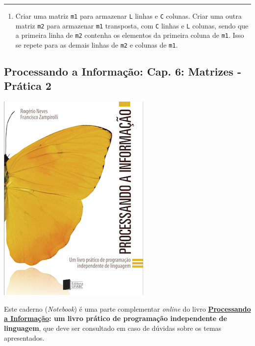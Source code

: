 \documentclass[12pt,a4paper]{article}
\renewcommand{\linethickness}{0.05em}
\providecommand{\tightlist}{%
      \setlength{\itemsep}{0pt}\setlength{\parskip}{0pt}}
\begin{document}
    \begin{center}\rule{0.5\linewidth}{\linethickness}\end{center}

\begin{enumerate}
\def\labelenumi{\arabic{enumi}.}
\setcounter{enumi}{4}
\tightlist
\item
  Criar uma matriz \texttt{m1} para armazenar \texttt{L} linhas e
  \texttt{C} colunas. Criar uma outra matriz \texttt{m2} para armazenar
  \texttt{m1} transposta, com \texttt{C} linhas e \texttt{L} colunas,
  sendo que a primeira linha de \texttt{m2} contenha os elementos da
  primeira coluna de \texttt{m1}. Isso se repete para as demais linhas
  de \texttt{m2} e colunas de \texttt{m1}.
\end{enumerate}

    \hypertarget{processando-a-informauxe7uxe3o-cap.-6-matrizes---pruxe1tica-2}{%
\subsection{Processando a Informação: Cap. 6: Matrizes - Prática
2}\label{processando-a-informauxe7uxe3o-cap.-6-matrizes---pruxe1tica-2}}

    \includegraphics{"figs/Capa_Processando_Informacao.jpg"}

Este caderno (\emph{Notebook}) é uma parte complementar \emph{online} do
livro
\textbf{\href{https://editora.ufabc.edu.br/matematica-e-ciencias-da-computacao/58-processando-a-informacao}{Processando
a Informação}: um livro prático de programação independente de
linguagem}, que deve ser consultado em caso de dúvidas sobre os temas
apresentados.
\end{document}
